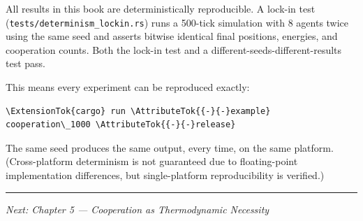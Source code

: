 All results in this book are deterministically reproducible. A lock-in test (\texttt{tests/determinism\_lockin.rs}) runs a 500-tick simulation with 8 agents twice using the same seed and asserts bitwise identical final positions, energies, and cooperation counts. Both the lock-in test and a different-seeds-different-results test pass.

This means every experiment can be reproduced exactly:


\begin{verbatim}
\ExtensionTok{cargo} run \AttributeTok{{-}{-}example} cooperation\_1000 \AttributeTok{{-}{-}release}
\end{verbatim}


The same seed produces the same output, every time, on the same platform. (Cross-platform determinism is not guaranteed due to floating-point implementation differences, but single-platform reproducibility is verified.)

\begin{center}\rule{0.5\linewidth}{0.5pt}\end{center}

\emph{Next: Chapter 5 --- Cooperation as Thermodynamic Necessity}
